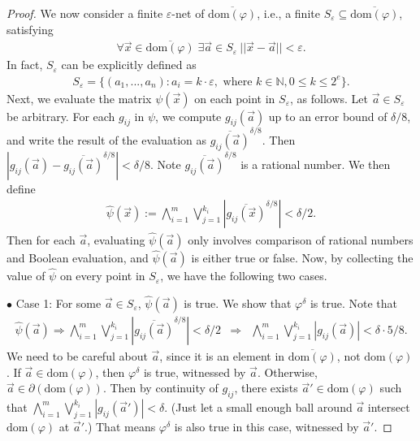 \documentclass[prodmode]{acmsmall} %
\newcommand{\dom}{\mathrm{dom}}
\begin{document}
\begin{proof}
We now consider a finite $\varepsilon$-net of $\overline{\dom(\varphi)}$, i.e., a finite $S_{\varepsilon} \subseteq \overline{\dom(\varphi)}$, satisfying
\begin{eqnarray}\label{two}
\forall \vec x\in \overline{\dom(\varphi)}\;\exists \vec a\in S_{\varepsilon}\ ||\vec x-\vec a||<\varepsilon. 
\end{eqnarray}
In fact, $S_{\varepsilon}$ can be explicitly defined as
\begin{eqnarray}\label{three}
S_{\varepsilon} = \{(a_1,...,a_n): a_i = k\cdot\varepsilon, \mbox{ where } k\in \mathbb{N}, 0\leq k\leq 2^e \}.
\end{eqnarray}
Next, we evaluate the matrix $\psi(\vec x)$ on each point in $S_{\varepsilon}$, as follows. Let $\vec a\in S_{\varepsilon}$ be arbitrary. For each $g_{ij}$ in $\psi$, we compute $g_{ij}(\vec a)$ up to an error bound of $\delta/8$, and write the result of the evaluation as $\overline{g_{ij}(\vec a)}^{\delta/8}$. Then $|g_{ij}(\vec a)- \overline{g_{ij}(\vec a)}^{\delta/8}|<{\delta}/{8}.$ Note $\overline{g_{ij}(\vec a)}^{\delta/8}$ is a rational number. We then define
\begin{eqnarray}
\widehat{\psi}(\vec x):= \bigwedge_{i=1}^m \bigvee_{j=1}^{k_i} |\overline{g_{ij}(\vec x)}^{\delta/8}|<\delta/2.
\end{eqnarray}
Then for each $\vec a$, evaluating $\widehat{\psi}(\vec a)$ only involves comparison of rational numbers and Boolean evaluation, and $\widehat{\psi}(\vec a)$ is either true or false. Now, by collecting the value of $\widehat{\psi}$ on every point in $S_{\varepsilon}$, we have the following two cases. 

$\bullet$ Case 1: For some $\vec a\in S_{\varepsilon}$, $\widehat{\psi}(\vec a)$ is true. We show that $\varphi^{\delta}$ is true. Note that
\begin{eqnarray*}
\widehat{\psi}(\vec a) \Rightarrow \bigwedge_{i=1}^m \bigvee_{j=1}^{k_i} |\overline{g_{ij}(\vec a)}^{\delta/8}|<\delta/2 
&\Rightarrow&\bigwedge_{i=1}^m \bigvee_{j=1}^{k_i} |g_{ij}(\vec a)|<\delta\cdot 5/8.
\end{eqnarray*}
We need to be careful about $\vec a$, since it is an element in $\overline{\dom(\varphi)}$, not $\dom(\varphi)$. If $\vec a\in \dom(\varphi)$, then $\varphi^{\delta}$ is true, witnessed by $\vec a$. Otherwise, $\vec a\in \partial(\dom(\varphi))$. Then by continuity of $g_{ij}$, there exists $\vec a'\in \dom(\varphi)$ such that $\bigwedge_{i=1}^m \bigvee_{j=1}^{k_i} |g_{ij}(\vec a')|<\delta$. (Just let a small enough ball around $\vec a$ intersect $\dom(\varphi)$ at $\vec a'$.) That means $\varphi^{\delta}$ is also true in this case, witnessed by $\vec a'$.


\end{proof}
\end{document}
